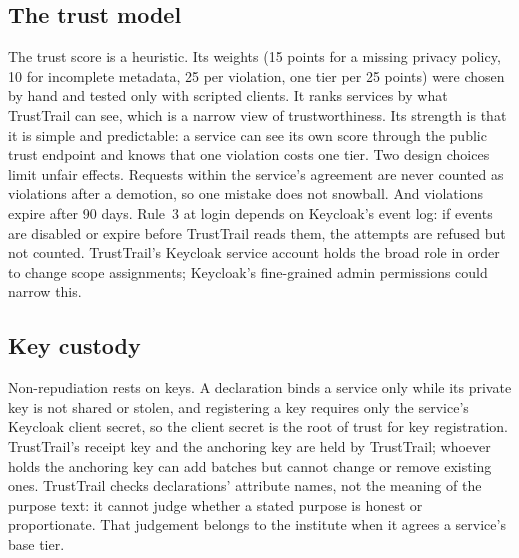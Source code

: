 \subsection{The trust model}
The trust score is a heuristic. Its weights (15 points for a missing privacy policy, 10 for incomplete metadata, 25 per violation, one tier per 25 points) were chosen by hand and tested only with scripted clients. It ranks services by what TrustTrail can see, which is a narrow view of trustworthiness. Its strength is that it is simple and predictable: a service can see its own score through the public trust endpoint and knows that one violation costs one tier. Two design choices limit unfair effects. Requests within the service's agreement are never counted as violations after a demotion, so one mistake does not snowball. And violations expire after 90 days. Rule~3 at login depends on Keycloak's event log: if events are disabled or expire before TrustTrail reads them, the attempts are refused but not counted. TrustTrail's Keycloak service account holds the broad  role in order to change scope assignments; Keycloak's fine-grained admin permissions could narrow this.

\subsection{Key custody}
Non-repudiation rests on keys. A declaration binds a service only while its private key is not shared or stolen, and registering a key requires only the service's Keycloak client secret, so the client secret is the root of trust for key registration. TrustTrail's receipt key and the anchoring key are held by TrustTrail; whoever holds the anchoring key can add batches but cannot change or remove existing ones. TrustTrail checks declarations' attribute names, not the meaning of the purpose text: it cannot judge whether a stated purpose is honest or proportionate. That judgement belongs to the institute when it agrees a service's base tier.

